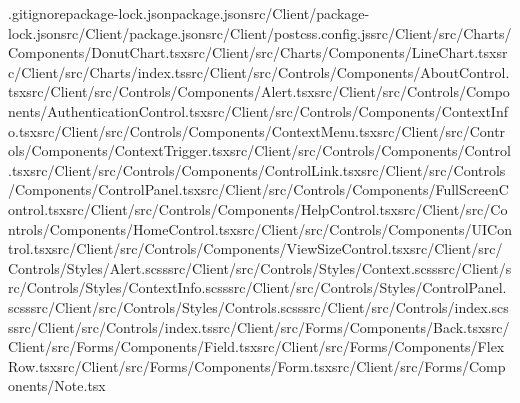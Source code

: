 \documentclass[a4paper,12pt]{article}
\begin{document}
.gitignore\newline package-lock.json\newline package.json\newline src/Client/package-lock.json\newline src/Client/package.json\newline src/Client/postcss.config.js\newline src/Client/src/Charts/Components/DonutChart.tsx\newline src/Client/src/Charts/Components/LineChart.tsx\newline src/Client/src/Charts/index.ts\newline src/Client/src/Controls/Components/AboutControl.tsx\newline src/Client/src/Controls/Components/Alert.tsx\newline src/Client/src/Controls/Components/AuthenticationControl.tsx\newline src/Client/src/Controls/Components/ContextInfo.tsx\newline src/Client/src/Controls/Components/ContextMenu.tsx\newline src/Client/src/Controls/Components/ContextTrigger.tsx\newline src/Client/src/Controls/Components/Control.tsx\newline src/Client/src/Controls/Components/ControlLink.tsx\newline src/Client/src/Controls/Components/ControlPanel.tsx\newline src/Client/src/Controls/Components/FullScreenControl.tsx\newline src/Client/src/Controls/Components/HelpControl.tsx\newline src/Client/src/Controls/Components/HomeControl.tsx\newline src/Client/src/Controls/Components/UIControl.tsx\newline src/Client/src/Controls/Components/ViewSizeControl.tsx\newline src/Client/src/Controls/Styles/Alert.scss\newline src/Client/src/Controls/Styles/Context.scss\newline src/Client/src/Controls/Styles/ContextInfo.scss\newline src/Client/src/Controls/Styles/ControlPanel.scss\newline src/Client/src/Controls/Styles/Controls.scss\newline src/Client/src/Controls/index.scss\newline src/Client/src/Controls/index.ts\newline src/Client/src/Forms/Components/Back.tsx\newline src/Client/src/Forms/Components/Field.tsx\newline src/Client/src/Forms/Components/FlexRow.tsx\newline src/Client/src/Forms/Components/Form.tsx\newline src/Client/src/Forms/Components/Note.tsx\newline 
\end{document}
